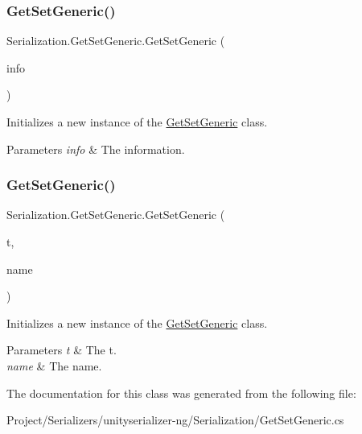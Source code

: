 \subsubsection{\texorpdfstring{Get\+Set\+Generic()}{GetSetGeneric()}\hspace{0.1cm}{\footnotesize\ttfamily [2/3]}}
{\footnotesize\ttfamily Serialization.\+Get\+Set\+Generic.\+Get\+Set\+Generic (\begin{DoxyParamCaption}\item[{\hyperlink{class_serialization_1_1_get_set_a1023fc00dbf0857c5a41dbad0b791a8c}{Field\+Info}}]{info }\end{DoxyParamCaption})\hspace{0.3cm}{\ttfamily [inline]}}



Initializes a new instance of the \hyperlink{class_serialization_1_1_get_set_generic}{Get\+Set\+Generic} class. 


\begin{DoxyParams}{Parameters}
{\em info} & The information.\\
\hline
\end{DoxyParams}
\mbox{\label{class_serialization_1_1_get_set_generic_ac7ba4e9f256af2301924597b9862a841}} 
\subsubsection{\texorpdfstring{Get\+Set\+Generic()}{GetSetGeneric()}\hspace{0.1cm}{\footnotesize\ttfamily [3/3]}}
{\footnotesize\ttfamily Serialization.\+Get\+Set\+Generic.\+Get\+Set\+Generic (\begin{DoxyParamCaption}\item[{Type}]{t,  }\item[{string}]{name }\end{DoxyParamCaption})\hspace{0.3cm}{\ttfamily [inline]}}



Initializes a new instance of the \hyperlink{class_serialization_1_1_get_set_generic}{Get\+Set\+Generic} class. 


\begin{DoxyParams}{Parameters}
{\em t} & The t.\\
\hline
{\em name} & The name.\\
\hline
\end{DoxyParams}


The documentation for this class was generated from the following file\+:\begin{DoxyCompactItemize}
\item 
Project/\+Serializers/unityserializer-\/ng/\+Serialization/Get\+Set\+Generic.\+cs\end{DoxyCompactItemize}
